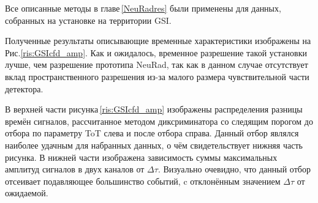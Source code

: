 

Все описанные методы в главе\,\ref{NeuRadres} были применены для данных, собранных на установке на территории GSI.


Полученные результаты описывающие временные характеристики изображены на Рис.\ref{ris:GSIcfd_amp}. Как и ожидалось, временное разрешение такой установки лучше, чем разрешение прототипа NeuRad, так как в данном случае отсутствует вклад пространственного разрешения из-за малого размера чувствительной части детектора.

В верхней части рисунка\,\ref{ris:GSIcfd_amp} изображены распределения разницы времён сигналов, рассчитанное методом диксриминатора со следящим порогом до отбора по параметру ToT слева и после отбора справа. Данный отбор являлся наиболее удачным для набранных данных, о чём свидетельствует нижняя часть рисунка. В нижней части изображена зависимость суммы максимальных амплитуд сигналов в двух каналов от $\Delta\tau$. Визуально очевидно, что данный отбор отсеивает подавляющее большинство событий, c отклонённым значением $\Delta\tau$ от ожидаемой.

